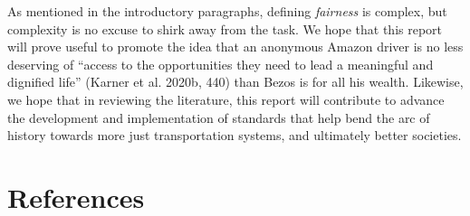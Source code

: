 \documentclass[12pt, oneside]{report}
\begin{document}
As mentioned in the introductory paragraphs, defining \emph{fairness} is
complex, but complexity is no excuse to shirk away from the task. We
hope that this report will prove useful to promote the idea that an
anonymous Amazon driver is no less deserving of ``access to the
opportunities they need to lead a meaningful and dignified life''
(Karner et al. 2020b, 440) than Bezos is for all his wealth. Likewise,
we hope that in reviewing the literature, this report will contribute to
advance the development and implementation of standards that help bend
the arc of history towards more just transportation systems, and
ultimately better societies.

\newpage

\hypertarget{references}{%
\section{References}\label{references}}
\end{document}
